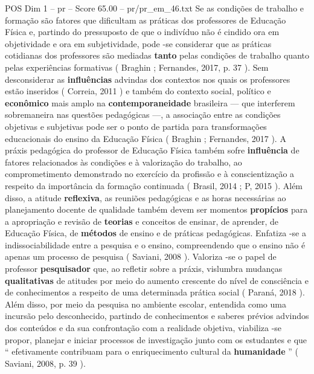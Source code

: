 \begin{textsample}{POS Dim 1 – pr – Score 65.00 – pr/pr\_em\_46.txt}
Se as condições de trabalho e formação são fatores que dificultam as práticas dos professores de Educação Física e, partindo do pressuposto de que o indivíduo não é cindido ora em objetividade e ora em subjetividade, pode -se considerar que as práticas cotidianas dos professores são mediadas \textbf{tanto} pelas condições de trabalho quanto pelas experiências formativas ( Braghin ; Fernandes, 2017, p. 37 ).
Sem desconsiderar as \textbf{influências} advindas dos contextos nos quais os professores estão inseridos ( Correia, 2011 ) e também do contexto social, político e \textbf{econômico} mais amplo na \textbf{contemporaneidade} brasileira — que interferem sobremaneira nas questões pedagógicas —, a associação entre as condições objetivas e subjetivas pode ser o ponto de partida para transformações educacionais do ensino da Educação Física ( Braghin ; Fernandes, 2017 ).
A práxis pedagógica do professor de Educação Física também sofre \textbf{influência} de fatores relacionados às condições e à valorização do trabalho, ao comprometimento demonstrado no exercício da profissão e à conscientização a respeito da importância da formação continuada ( Brasil, 2014 ; P, 2015 ).
Além disso, a atitude \textbf{reflexiva}, as reuniões pedagógicas e as horas necessárias ao planejamento docente de qualidade também devem ser momentos \textbf{propícios} para a apropriação e revisão de \textbf{teorias} e conceitos de ensinar, de aprender, de Educação Física, de \textbf{métodos} de ensino e de práticas pedagógicas.
Enfatiza -se a indissociabilidade entre a pesquisa e o ensino, compreendendo que o ensino não é apenas um processo de pesquisa ( Saviani, 2008 ).
Valoriza -se o papel de professor \textbf{pesquisador} que, ao refletir sobre a práxis, vislumbra mudanças \textbf{qualitativas} de atitudes por meio do aumento crescente do nível de consciência e de conhecimentos a respeito de uma determinada prática social ( Paraná, 2018 ).
Além disso, por meio da pesquisa no ambiente escolar, entendida como uma incursão pelo desconhecido, partindo de conhecimentos e saberes prévios advindos dos conteúdos e da sua confrontação com a realidade objetiva, viabiliza -se propor, planejar e iniciar processos de investigação junto com os estudantes e que “ efetivamente contribuam para o enriquecimento cultural da \textbf{humanidade} ” ( Saviani, 2008, p. 39 ).

\end{textsample}
